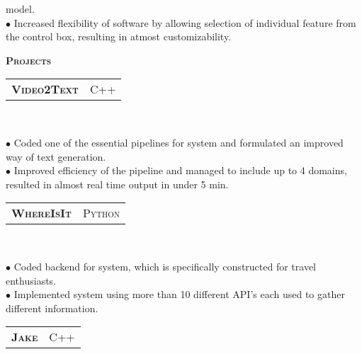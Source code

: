 \documentclass[10pt,letterpaper,oneside]{article}
\begin{document}
\begin{minipage}[t]{0.63\textwidth}
\begin{adjustwidth}{7pt}{0pt}
{            model.\\
        $\bullet$ Increased flexibility of software by allowing selection of individual feature from the control box, resulting in atmost
    customizability.}\\
        \end{adjustwidth}
        \textcolor{light-gray}{\textbf{\large P\textsc{rojects}}}
        \vspace{10pt}\\
        \begin{tabular}{c|c}
            \textbf{\normalsize V\textsc{ideo}2T\textsc{ext}}
            &\textmd{\normalsize C\textsc{++}}
        \end{tabular}\\
        \vspace{-4mm}
        \begin{adjustwidth}{7pt}{0pt}
            {\footnotesize $\bullet$ Coded one of the essential pipelines for system and formulated an improved way of text generation.\\
            $\bullet$ Improved efficiency of the pipeline and managed to include up to 4 domains, resulted in almost real time output in
        under 5 min. }\\ 
        \end{adjustwidth}
        \begin{tabular}{c|c}
            \textbf{\normalsize W\textsc{here}I\textsc{s}I\textsc{t}}
            &\textmd{\normalsize P\textsc{ython}}
        \end{tabular}\\
         \vspace{-4mm}
        \begin{adjustwidth}{7pt}{0pt}
            {\footnotesize $\bullet$ Coded backend for system, which is specifically constructed for travel enthusiasts.\\ 
            $\bullet$ Implemented system using more than 10 different API's each used to gather different information.}\\ 
        \end{adjustwidth}
        \begin{tabular}{c|c}
            \textbf{\normalsize J\textsc{ake}}
            &\textmd{\normalsize C\textsc{++}}
        \end{tabular}\\
         \vspace{-4mm}
        \begin{adjustwidth}{7pt}{0pt}

\end{adjustwidth}
\end{minipage}
\end{document}
